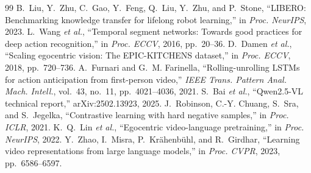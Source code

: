 \documentclass[conference,a4paper]{IEEEtran}
\begin{document}
\begin{thebibliography}{99}
 B.~Liu, Y.~Zhu, C.~Gao, Y.~Feng, Q.~Liu, Y.~Zhu, and P.~Stone, ``LIBERO: Benchmarking knowledge transfer for lifelong robot learning,'' in \emph{Proc. NeurIPS}, 2023.
 L.~Wang \emph{et al.}, ``Temporal segment networks: Towards good practices for deep action recognition,'' in \emph{Proc. ECCV}, 2016, pp.~20--36.
 D.~Damen \emph{et al.}, ``Scaling egocentric vision: The EPIC-KITCHENS dataset,'' in \emph{Proc. ECCV}, 2018, pp.~720--736.
 A.~Furnari and G.~M. Farinella, ``Rolling-unrolling LSTMs for action anticipation from first-person video,'' \emph{IEEE Trans. Pattern Anal. Mach. Intell.}, vol.~43, no.~11, pp.~4021--4036, 2021.
 S.~Bai \emph{et al.}, ``Qwen2.5-VL technical report,'' arXiv:2502.13923, 2025.
 J.~Robinson, C.-Y. Chuang, S.~Sra, and S.~Jegelka, ``Contrastive learning with hard negative samples,'' in \emph{Proc. ICLR}, 2021.
 K.~Q.~Lin \emph{et al.}, ``Egocentric video-language pretraining,'' in \emph{Proc. NeurIPS}, 2022.
 Y.~Zhao, I.~Misra, P.~Kr\"ahenb\"uhl, and R.~Girdhar, ``Learning video representations from large language models,'' in \emph{Proc. CVPR}, 2023, pp.~6586--6597.
\end{thebibliography}
\end{document}
